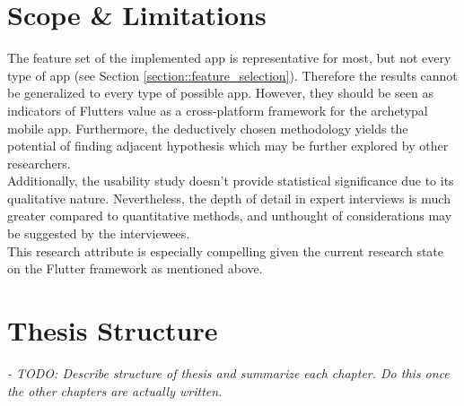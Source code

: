 \section{Scope \& Limitations}
The feature set of the implemented app is representative for most, but not every type of app (see Section \ref{section::feature_selection}). 
Therefore the results cannot be generalized to every type of possible app. 
However, they should be seen as indicators of Flutters value as a cross-platform framework for the 
archetypal mobile app. 
Furthermore, the deductively chosen methodology yields the potential of finding adjacent hypothesis which may be
further explored by other researchers.\\
Additionally, the usability study doesn't provide statistical significance due to its qualitative nature. Nevertheless, the depth of detail
in expert interviews is much greater compared to quantitative methods, and unthought of considerations may be suggested by the interviewees.\\
This research attribute is especially compelling given the current research state on the Flutter framework as mentioned above. 

\section{Thesis Structure}
\textit{- TODO: Describe structure of thesis and summarize each chapter. Do this once the other chapters are actually written.}
